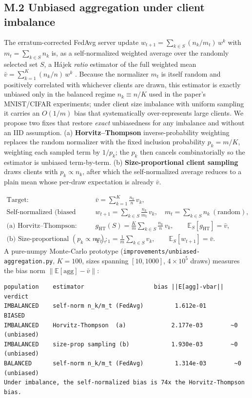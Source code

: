 \documentclass[11pt]{article}
\begin{document}
\subsection*{M.2 Unbiased aggregation under client imbalance}

The erratum-corrected FedAvg server update $w_{t+1}=\sum_{k\in S}(n_k/m_t)\,w^k$ with $m_t=\sum_{k\in S}n_k$ is, as a self-normalized weighted average over the randomly selected set $S$, a H\'ajek \emph{ratio} estimator of the full weighted mean $\bar v=\sum_{k=1}^K (n_k/n)\,w^k$ \citep{mcmahan2017fedavg}. Because the normalizer $m_t$ is itself random and positively correlated with whichever clients are drawn, this estimator is exactly unbiased only in the balanced regime $n_k\equiv n/K$ used in the paper's MNIST/CIFAR experiments; under client size imbalance with uniform sampling it carries an $O(1/m)$ bias that systematically over-represents large clients. We propose two fixes that restore \emph{exact} unbiasedness for any imbalance and without an IID assumption. (a) \textbf{Horvitz--Thompson} inverse-probability weighting replaces the random normalizer with the fixed inclusion probability $p_k=m/K$, weighting each sampled term by $1/p_k$; the $p_k$ then cancels combinatorially so the estimator is unbiased term-by-term. (b) \textbf{Size-proportional client sampling} draws clients with $p_k\propto n_k$, after which the self-normalized average reduces to a plain mean whose per-draw expectation is already $\bar v$.

\begin{align}
\text{Target:}\quad & \bar v = \textstyle\sum_{k=1}^{K}\tfrac{n_k}{n}\,v_k,\\
\text{Self-normalized (biased under imbalance):}\quad & w_{t+1}=\textstyle\sum_{k\in S}\tfrac{n_k}{m_t}\,v_k,\quad m_t=\textstyle\sum_{k\in S} n_k\ (\text{random}),\\
\text{(a) Horvitz--Thompson:}\quad & g_{\mathrm{HT}}(S)=\tfrac{K}{m}\textstyle\sum_{k\in S}\tfrac{n_k}{n}\,v_k,\qquad \mathbb{E}_S[g_{\mathrm{HT}}]=\bar v,\\
\text{(b) Size-proportional } (p_k\propto n_k):\quad & w_{t+1}=\tfrac{1}{m}\textstyle\sum_{k\in S} v_k,\qquad \mathbb{E}_S[w_{t+1}]=\bar v.
\end{align}
A pure-numpy Monte-Carlo prototype (\texttt{improvements/unbiased-aggregation.py}, $K{=}100$, sizes spanning $[10,1000]$, $4\times10^5$ draws) measures the bias norm $\lVert\mathbb{E}[\text{agg}]-\bar v\rVert$:

\begin{lstlisting}
population    estimator                    bias ||E[agg]-vbar||   verdict
IMBALANCED    self-norm n_k/m_t (FedAvg)         1.612e-01        BIASED
IMBALANCED    Horvitz-Thompson  (a)             2.177e-03        ~0 (unbiased)
IMBALANCED    size-prop sampling (b)            1.930e-03        ~0 (unbiased)
BALANCED      self-norm n_k/m_t (FedAvg)         1.314e-03        ~0 (unbiased)
Under imbalance, the self-normalized bias is 74x the Horvitz-Thompson bias.
\end{lstlisting}
\end{document}
